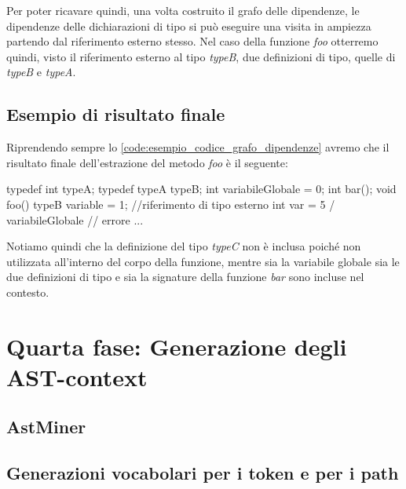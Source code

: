 Per poter ricavare quindi, una volta costruito il grafo delle dipendenze, le dipendenze delle dichiarazioni di tipo si può eseguire una visita in ampiezza partendo dal riferimento esterno stesso.
Nel caso della funzione \textit{foo} otterremo quindi, visto il riferimento esterno al tipo \textit{typeB}, due definizioni di tipo, quelle di \textit{typeB} e \textit{typeA}.  

\subsection{Esempio di risultato finale}
Riprendendo sempre lo \autoref{code:esempio_codice_grafo_dipendenze} avremo che il risultato finale dell'estrazione del metodo \textit{foo} è il seguente:


\begin{code}[language=c++, caption={Esempio di estrazione del codice della funzione foo insieme al contesto}, label={code:esempio_finale}]

  typedef int typeA;
  typedef typeA typeB; 
  int variabileGlobale = 0;
  int bar();
  void foo(){
    typeB variable = 1; //riferimento di tipo esterno
    int var = 5 / variabileGlobale // errore
    ...
  }

\end{code}

Notiamo quindi che la definizione del tipo \textit{typeC} non è inclusa poiché non utilizzata all'interno del corpo della funzione, mentre sia la variabile globale sia le due definizioni di tipo e sia la signature della funzione \textit{bar} sono incluse nel contesto.


\section{Quarta fase: Generazione degli AST-context}

\subsection{AstMiner}

\subsection{Generazioni vocabolari per i token e per i path}







